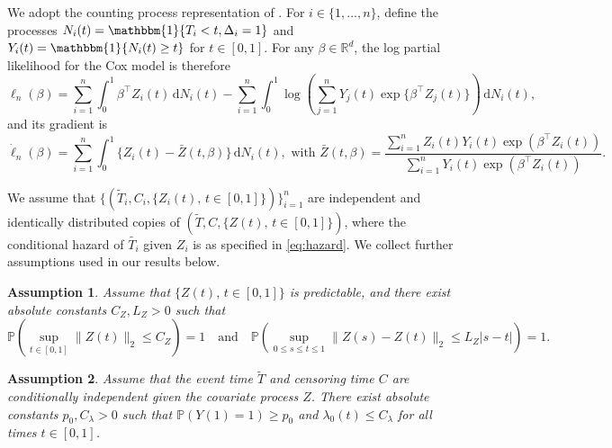 \documentclass[11pt]{article}
\newtheorem{assumption}{Assumption}
\newcommand{\dint}{\,\mathrm{d}}
\begin{document}
We adopt the counting process representation of \cite{andersen1982}.  For $i \in \{1, 
\ldots, n\}$, define the processes $N_i(t) = \mathbbm{1}\{T_i < t,  \Delta_i = 1\}$ and $Y_i(t) = \mathbbm{1}\{N_i(t) \geq t\}$ for $t \in [0, 1]$. For any $\beta \in \mathbb{R}^d$, the log partial likelihood for the Cox model is therefore
\begin{equation}
\label{eq:Cox_partial_likelihood}
    \ell_n(\beta) = \sum_{i=1}^n \int_0^1 \beta^\top Z_i(t) \dint N_i(t) - \sum_{i=1}^n \int_0^1 \log \left( \sum_{j=1}^n Y_j(t) \exp\{\beta^\top Z_j(t)\}\right) \dint N_i(t),
\end{equation}
and its gradient is
\begin{equation} \label{eq:Cox_grad}
    \dot{\ell}_n(\beta) = \sum_{i=1}^n \int_0^1 \{Z_i(t) - \bar{Z}(t, \beta) \} \dint N_i(t), \mbox{ with } \bar{Z}(t, \beta) = \frac{\sum_{i=1}^n Z_i(t)Y_i(t) \exp(\beta^\top Z_i(t))}{\sum_{i=1}^n Y_i(t) \exp(\beta^\top Z_i(t))}.
\end{equation}

We assume that $\{(\widetilde{T}_i, C_i, \{Z_i(t), \,t \in [0, 1]\})\}_{i=1}^n$ are independent and identically distributed copies of $(\widetilde{T}, C, \{Z(t), \,t \in [0, 1]\})$, where the conditional hazard of $\tilde{T_i}$ given $Z_i$ is as specified in \eqref{eq:hazard}. We collect further assumptions used in our results below. 

\begin{assumption} \label{assp:covariates} Assume that $\{Z(t), \,t \in [0, 1]\}$ is predictable, and there exist absolute constants $C_Z, L_Z >0$ such that 
\begin{equation*}
     \mathbb{P}\left(\sup_{t \in [0, 1]} \|Z(t)\|_2 \leq C_Z \right) = 1 \quad \mathrm{and} \quad \mathbb{P} \left( \sup_{0 \leq s \leq t \leq 1} \|Z(s) - Z(t)\|_2 \leq L_Z|s- t| \right) = 1.
\end{equation*}
\end{assumption}

\begin{assumption}\label{assp:indep_atrisk} Assume that the event time $\widetilde{T}$ and censoring time $C$ are conditionally independent given the covariate process $Z$. There exist absolute constants $p_0, C_\lambda > 0$ such that $\mathbb{P}(Y(1)=1) \geq p_0$ and $\lambda_0(t) \leq C_\lambda$ for all times $t \in [0, 1]$. 
\end{assumption}
\end{document}
